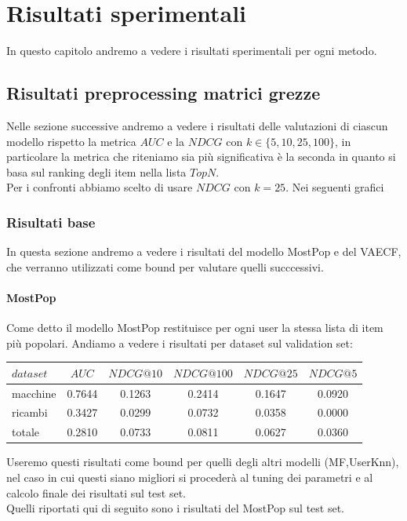 \hypertarget{(chap:capitolo6)}{}
\chapter{Risultati sperimentali}
In questo capitolo andremo a vedere i risultati sperimentali per ogni metodo.
\section{Risultati preprocessing matrici grezze}
Nelle sezione successive andremo a vedere i risultati delle valutazioni di ciascun modello rispetto la metrica $AUC$ e la $NDCG$ con $k\in \{5, 10, 25, 100\}$, in particolare la metrica che riteniamo sia più significativa è la seconda in quanto si basa sul ranking degli item nella lista $TopN$. \\
Per i confronti abbiamo scelto di usare $NDCG$ con $k=25$. Nei seguenti grafici

\subsection{Risultati base}
In questa sezione andremo a vedere i risultati del modello MostPop e del VAECF, che verranno utilizzati come bound per valutare quelli succcessivi. 

\subsubsection{MostPop}
Come detto il modello MostPop restituisce per ogni user la stessa lista di item più popolari.
Andiamo a vedere i risultati per dataset sul validation set:\\

\begin{tabular}{|l|c|cccc|}
    \toprule
    $dataset$ &    $AUC$ &  $NDCG@10$ & $NDCG@100$  & $NDCG@25$ & $NDCG@5$  \\
    \midrule
    macchine & 0.7644 & 0.1263 &   0.2414 &  0.1647 & 0.0920 \\
    ricambi  & 0.3427 &  0.0299 &   0.0732 &  0.0358 & 0.0000 \\
    totale  & 0.2810 &  0.0733 &   0.0811 &  0.0627 & 0.0360 \\

\bottomrule
\end{tabular}

Useremo questi risultati come bound per quelli degli altri modelli (MF,UserKnn), nel caso in cui questi siano migliori si procederà al tuning dei parametri e al calcolo finale dei risultati sul test set.\\
Quelli riportati qui di seguito sono i risultati del MostPop sul test set.\\

